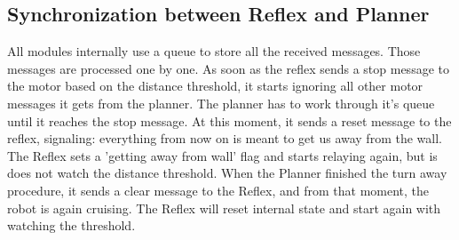 \subsection{Synchronization between Reflex and Planner}
All modules internally use a queue to store all the received messages. Those messages are processed one by one. As soon as the reflex sends a stop message to the motor based on the distance threshold, it starts ignoring all other motor messages it gets from the planner. The planner has to work through it's queue until it reaches the stop message. At this moment, it sends a reset message to the reflex, signaling: everything from now on is meant to get us away from the wall. The Reflex sets a 'getting away from wall' flag and starts relaying again, but is does not watch the distance threshold. When the Planner finished the turn away procedure, it sends a clear message to the Reflex, and from that moment, the robot is again cruising. The Reflex will reset internal state and start again with watching the threshold.